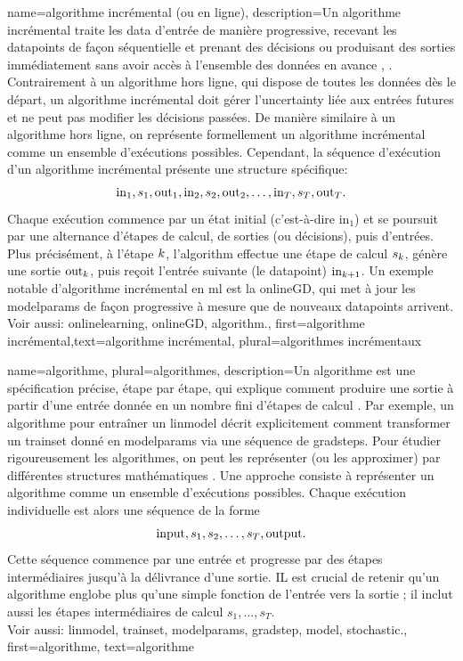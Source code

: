 {name={algorithme incrémental (ou en ligne)},
	description={Un algorithme incrémental traite les \gls{data} d’entrée de manière progressive, recevant les \glspl{datapoint} de façon séquentielle et prenant des décisions ou produisant des sorties immédiatement sans avoir accès à l’ensemble des données en avance \cite{PredictionLearningGames}, \cite{HazanOCO}. Contrairement à un algorithme hors ligne, qui dispose de toutes les données dès le départ, un algorithme incrémental doit gérer l’\gls{uncertainty} liée aux entrées futures et ne peut pas modifier les décisions passées.  
		De manière similaire à un algorithme hors ligne, on représente formellement un algorithme incrémental comme un ensemble d’exécutions possibles. Cependant, la séquence d’exécution d’un algorithme incrémental présente une structure spécifique:  
		$${\rm in}_{1}, s_1, {\rm out}_{1}, {\rm in}_{2}, s_2, {\rm out}_{2}, \ldots, {\rm in}_{T}, s_T, {\rm out}_{T}.$$  
		Chaque exécution commence par un état initial (c’est-à-dire \(\text{in}_{1}\)) et se poursuit par une alternance d’étapes de calcul, de sorties (ou décisions), puis d’entrées. Plus précisément, à l’étape \(k\), l’\gls{algorithm} effectue une étape de calcul \(s_{k}\), génère une sortie \(\text{out}_{k}\), puis reçoit l’entrée suivante (le \gls{datapoint}) \(\text{in}_{k+1}\).  
		Un exemple notable d’algorithme incrémental en \gls{ml} est la \gls{onlineGD}, qui met à jour les \gls{modelparams} de façon progressive à mesure que de nouveaux \glspl{datapoint} arrivent.  
		\\ Voir aussi: \gls{onlinelearning}, \gls{onlineGD}, \gls{algorithm}.},
	first={algorithme incrémental},text={algorithme incrémental}, plural={algorithmes incrémentaux}}

{name={algorithme}, plural={algorithmes},
	description={Un algorithme est une spécification précise, étape par étape, qui explique comment produire une sortie à partir d’une entrée donnée en un nombre fini d’étapes de calcul \cite{Cormen:2022aa}.  
		Par exemple, un algorithme pour entraîner un \gls{linmodel} décrit explicitement comment transformer un \gls{trainset} donné en \gls{modelparams} via une séquence de \glspl{gradstep}.  
		Pour étudier rigoureusement les algorithmes, on peut les représenter (ou les approximer) par différentes structures mathématiques \cite{Sipser2013}.  
		Une approche consiste à représenter un algorithme comme un ensemble d’exécutions possibles. Chaque exécution individuelle est alors une séquence de la forme $${\rm input}, s_1, s_2, \ldots, s_T, {\rm output}.$$  
		Cette séquence commence par une entrée et progresse par des étapes intermédiaires jusqu’à la délivrance d’une sortie.  
		IL est crucial de retenir qu'un algorithme englobe plus qu’une simple fonction de l’entrée vers la sortie ; il inclut aussi les étapes intermédiaires de calcul $s_1, \ldots, s_T$.
		\\
		Voir aussi: \gls{linmodel}, \gls{trainset}, \gls{modelparams}, \gls{gradstep}, \gls{model}, \gls{stochastic}.},
	first={algorithme},
	text={algorithme}
}

